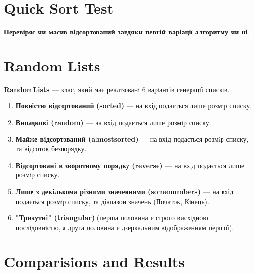 \documentclass{article}
\begin{document}
\section{Quick Sort Test}
\textbf{Перевіряє чи масив відсортований завдяки певній варіації алгоритму чи ні.}

\section{Random Lists}
\textbf{RandomLists} --- клас, який має реалiзованi 6 варiантів генерацiї спискiв.
\begin{enumerate}
    \item \textbf{Повнiстю вiдсортований (sorted)} --- на вхід подається лише розмiр списку.
    \item \textbf{Випадковi (random)} --- на вхід подається лише розмiр списку.
    \item \textbf{Майже вiдсортований (almostsorted)} --- на вхід подається розмiр списку, та відсоток безпорядку.
    \item \textbf{Вiдсортованi в зворотному порядку (reverse)} --- на вхід подається лише розмiр списку.
    \item \textbf{Лише з декiлькома рiзними значеннями (somenumbers)} --- на вхід подається розмiр списку, та діапазон значень (Початок, Кiнець).
    \item \textbf{"Трикутнi" (triangular)} (перша половина є строго висхiдною послiдовнiстю, а друга половина є дзеркальним вiдображенням першої).
\end{enumerate}
\newpage

\section{Comparisions and Results}
\end{document}
